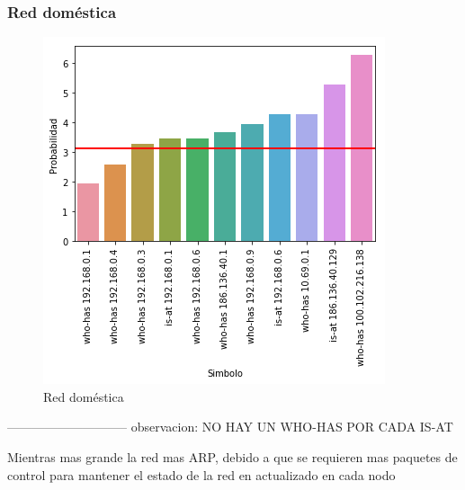 \subsubsection{Red doméstica}

\begin{figure}[H]
	\centering
	\includegraphics[width=.5\linewidth]{imagenes/manu_casa_hosts}
	\caption{Red doméstica}
\end{figure}

-----------------------------
observacion: NO HAY UN WHO-HAS POR CADA IS-AT

Mientras mas grande la red mas ARP, debido a que se requieren mas paquetes de control para mantener el estado de la red en actualizado en cada nodo